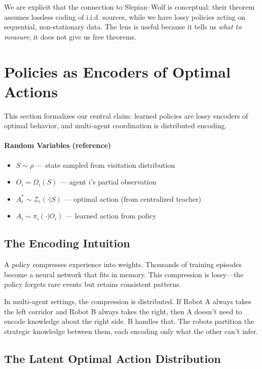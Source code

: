 \documentclass[10pt, letterpaper]{article}
\begin{document}
We are explicit that the connection to Slepian--Wolf is conceptual: their theorem assumes lossless coding of i.i.d. sources, while we have lossy policies acting on sequential, non-stationary data. The lens is useful because it tells us \emph{what to measure}; it does not give us free theorems.

\section{Policies as Encoders of Optimal Actions}
\label{sec:policies-as-encoders}

This section formalizes our central claim: learned policies are lossy encoders of optimal behavior, and multi-agent coordination is distributed encoding.

\paragraph{Random Variables (reference)}
\begin{itemize}
    \item $S \sim \rho$ --- state sampled from visitation distribution
    \item $O_i = \Omega_i(S)$ --- agent $i$'s partial observation
    \item $A_i^* \sim \mathcal{Z}_i(\cdot|S)$ --- optimal action (from centralized teacher)
    \item $A_i \sim \pi_i(\cdot|O_i)$ --- learned action from policy
\end{itemize}

\subsection{The Encoding Intuition}

A policy compresses experience into weights. Thousands of training episodes become a neural network that fits in memory. This compression is lossy---the policy forgets rare events but retains consistent patterns.

In multi-agent settings, the compression is distributed. If Robot A always takes the left corridor and Robot B always takes the right, then A doesn't need to encode knowledge about the right side. B handles that. The robots partition the strategic knowledge between them, each encoding only what the other can't infer.

\subsection{The Latent Optimal Action Distribution}
\end{document}
